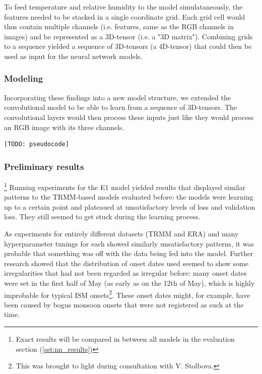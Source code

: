 To feed temperature and relative humidity to the model simulataneously, the features needed to be stacked in a single coordinate grid. Each grid cell would thus contain multiple channels (i.e. features, same as the RGB channels in images) and be represented as a 3D-tensor (i.e. a "3D matrix"). Combining grids to a sequence yielded a sequence of 3D-tensors (a 4D-tensor) that could then be used as input for the neural network models.

\subsubsection{Modeling}
\label{ssst:nn_e1_modeling}
Incorporating these findings into a new model structure, we extended the convolutional model to be able to learn from a sequence of 3D-tensors. The convolutional layers would then process these inputs just like they would process an RGB image with its three channels.

\begin{figure}[h]
\end{figure}

\begin{lstlisting}[language=Python]
  [TODO: pseudocode]
\end{lstlisting}

\subsubsection{Preliminary results}{\footnote{Exact results will be compared in between all models in the evaluation section (\cref{sst:nn_results})}}
\label{ssst:nn_e1_results}
Running experiments for the E1 model yielded results that displayed similar patterns to the TRMM-based models evaluated before: the models were learning up to a certain point and plateaued at unsatisfactory levels of loss and validation loss. They still seemed to get stuck during the learning process.

As experiments for entirely different datasets (TRMM and ERA) and many hyperparameter tunings for each showed similarly unsatisfactory patterns, it was probable that something was off with the data being fed into the model. Further research showed that the distribution of onset dates used seemed to show some irregularities that had not been regarded as irregular before: many onset dates were set in the first half of May (as early as on the 12th of May), which is highly improbable for typical ISM onsets\footnote{This was brought to light during consultation with V. Stolbova.}. These onset dates might, for example, have been caused by bogus monsoon onsets that were not registered as such at the time.

